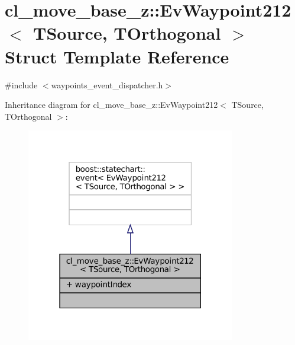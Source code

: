 \hypertarget{structcl__move__base__z_1_1EvWaypoint212}{}\section{cl\+\_\+move\+\_\+base\+\_\+z\+:\+:Ev\+Waypoint212$<$ T\+Source, T\+Orthogonal $>$ Struct Template Reference}
\label{structcl__move__base__z_1_1EvWaypoint212}


{\ttfamily \#include $<$waypoints\+\_\+event\+\_\+dispatcher.\+h$>$}



Inheritance diagram for cl\+\_\+move\+\_\+base\+\_\+z\+:\+:Ev\+Waypoint212$<$ T\+Source, T\+Orthogonal $>$\+:
\nopagebreak
\begin{figure}[H]
\begin{center}
\leavevmode
\includegraphics[width=259pt]{structcl__move__base__z_1_1EvWaypoint212__inherit__graph}
\end{center}
\end{figure}


